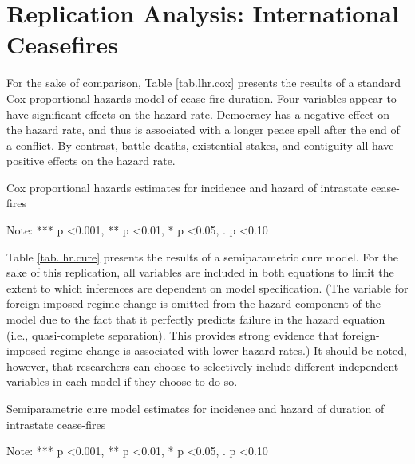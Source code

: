 
\section{Replication Analysis: International Ceasefires}

For the sake of comparison, Table \ref{tab.lhr.cox} presents the results of a standard Cox proportional hazards model of cease-fire duration. Four variables appear to have significant effects on the hazard rate. Democracy has a negative effect on the hazard rate, and thus is associated with a longer peace spell after the end of a conflict. By contrast, battle deaths, existential stakes, and contiguity all have positive effects on the hazard rate.

\begin{table}
	\caption{Cox proportional hazards estimates for incidence and hazard of intrastate cease-fires} 
	\label{tab.lhr.cox}
	
	Note: *** p \textless 0.001, ** p \textless 0.01, * p \textless 0.05, . p \textless 0.10
\end{table}

Table \ref{tab.lhr.cure} presents the results of a semiparametric cure model. For the sake of this replication, all variables are included in both equations to limit the extent to which inferences are dependent on model specification. (The variable for foreign imposed regime change is omitted from the hazard component of the model due to the fact that it perfectly predicts failure in the hazard equation (i.e., quasi-complete separation). This provides strong evidence that foreign-imposed regime change is associated with lower hazard rates.) It should be noted, however, that researchers can choose to selectively include different independent variables in each model if they choose to do so. 

\begin{table}
	\caption{Semiparametric cure model estimates for incidence and hazard of duration of intrastate cease-fires} 
	\label{tab.lhr.cure}
	
	Note: *** p \textless 0.001, ** p \textless 0.01, * p \textless 0.05, . p \textless 0.10
\end{table}

